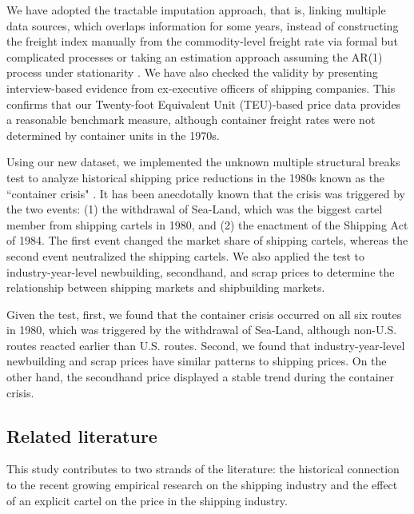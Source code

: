 \documentclass[11pt]{article}
\begin{document}
We have adopted the tractable imputation approach, that is, linking multiple data sources, which overlaps information for some years, instead of constructing the freight index manually from the commodity-level freight rate via formal but complicated processes or taking an estimation approach assuming the AR(1) process under stationarity \citep{jeon2022learning}. We have also checked the validity by presenting interview-based evidence from ex-executive officers of shipping companies. This confirms that our Twenty-foot Equivalent Unit (TEU)-based price data provides a reasonable benchmark measure, although container freight rates were not determined by container units in the 1970s.

Using our new dataset, we implemented the unknown multiple structural breaks test \citep{bai1998estimating,bai2003computation} to analyze historical shipping price reductions in the 1980s known as the ``container crisis" \citep{broeze2002globalisation}. It has been anecdotally known that the crisis was triggered by the two events: (1) the withdrawal of Sea-Land, which was the biggest cartel member from shipping cartels in 1980, and (2) the enactment of the Shipping Act of 1984. The first event changed the market share of shipping cartels, whereas the second event neutralized the shipping cartels. We also applied the test to industry-year-level newbuilding, secondhand, and scrap prices to determine the relationship between shipping markets and shipbuilding markets.

Given the test, first, we found that the container crisis occurred on all six routes in 1980, which was triggered by the withdrawal of Sea-Land, although non-U.S. routes reacted earlier than U.S. routes. Second, we found that industry-year-level newbuilding and scrap prices have similar patterns to shipping prices. On the other hand, the secondhand price displayed a stable trend during the container crisis.


\subsection{Related literature}\label{subsec:litereture}

This study contributes to two strands of the literature: the historical connection to the recent growing empirical research on the shipping industry and the effect of an explicit cartel on the price in the shipping industry.
\end{document}
